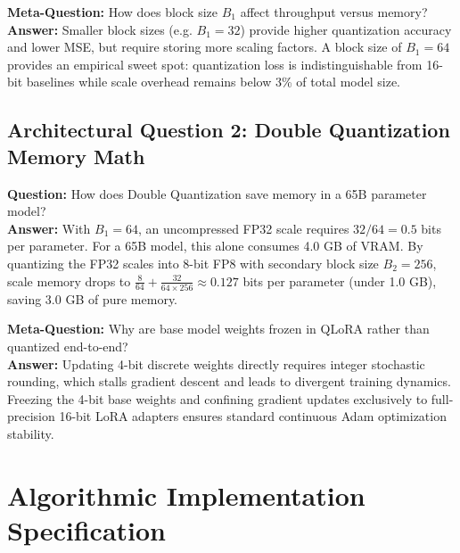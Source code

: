 \documentclass[11pt,a4paper]{article}
\theoremstyle{definition}
\begin{document}
\textbf{Meta-Question:} How does block size $B_1$ affect throughput versus memory?\\
\textbf{Answer:} Smaller block sizes (e.g. $B_1 = 32$) provide higher quantization accuracy and lower MSE, but require storing more scaling factors. A block size of $B_1 = 64$ provides an empirical sweet spot: quantization loss is indistinguishable from 16-bit baselines while scale overhead remains below 3\% of total model size.

\subsection{Architectural Question 2: Double Quantization Memory Math}
\textbf{Question:} How does Double Quantization save memory in a 65B parameter model?\\
\textbf{Answer:} With $B_1 = 64$, an uncompressed FP32 scale requires $32 / 64 = 0.5$ bits per parameter. For a 65B model, this alone consumes 4.0 GB of VRAM. By quantizing the FP32 scales into 8-bit FP8 with secondary block size $B_2 = 256$, scale memory drops to $\frac{8}{64} + \frac{32}{64 \times 256} \approx 0.127$ bits per parameter (under 1.0 GB), saving 3.0 GB of pure memory.

\textbf{Meta-Question:} Why are base model weights frozen in QLoRA rather than quantized end-to-end?\\
\textbf{Answer:} Updating 4-bit discrete weights directly requires integer stochastic rounding, which stalls gradient descent and leads to divergent training dynamics. Freezing the 4-bit base weights and confining gradient updates exclusively to full-precision 16-bit LoRA adapters ensures standard continuous Adam optimization stability.

\section{Algorithmic Implementation Specification}
\end{document}
